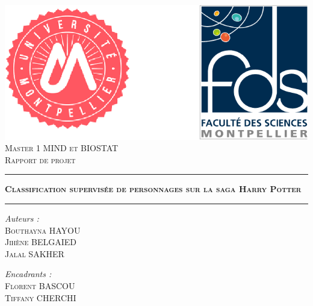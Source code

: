 \documentclass[11pt]{article}
\begin{document}
\thispagestyle{empty}
\begin{titlepage}
  \begin{sffamily}
  \begin{center}







    \includegraphics[width= 10 cm]{./figures/untitled.png}
    \\[3cm]
    \textsc{Master 1 MIND et BIOSTAT }\\
    \vspace{0.4cm}
    \textsc{Rapport de projet }\\
    \vspace{1cm}

    \hrule
    \vspace{0.4cm}
    { \huge \scshape \textbf{Classification supervisée de personnages sur la saga Harry Potter}}
    \vspace{0.4cm}
    \hrule
    \vspace{4 cm}



    \begin{minipage}{0.5\textwidth}
      \begin{flushleft} \Large
        \emph{Auteurs : }\\
        \textsc{Bouthayna HAYOU}\\
        \textsc{Jihène BELGAIED }\\
        \textsc{Jalal SAKHER}\\

      \end{flushleft}
    \end{minipage}
    \begin{minipage}{0.43\textwidth}
      \begin{flushright} \Large
        \emph{Encadrants : }\\
    \textsc{Florent BASCOU}\\
    \textsc{Tiffany CHERCHI}
      \end{flushright}
    \end{minipage}

    \vfill

  \end{center}
  \end{sffamily}
\end{titlepage}
\end{document}
